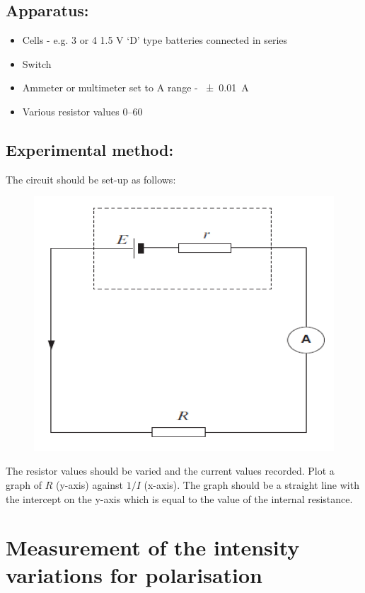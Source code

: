 \documentclass{tufte-handout}
\begin{document}
\subsection{Apparatus:} 
\begin{itemize}
\item Cells - e.g. 3 or 4 1.5 V `D' type batteries connected in series
\item Switch 
\item Ammeter or multimeter set to A range - \SI{\pm 0.01}{A}
\item Various resistor values \SIrange{0}{60}{\Omega}
\end{itemize}
\subsection{Experimental method:} 
The circuit should be set-up as follows:  
\begin{figure}
\includegraphics[width=\textwidth]{internalres.PNG}
\end{figure}

The resistor values should be varied and the current values recorded. Plot a graph of $R$  (y-axis) against $1/I$  (x-axis).  The graph should be a straight line with the intercept on the y-axis which is equal to the value of the internal resistance. 
\section{Measurement of the intensity variations for polarisation}
\end{document}
